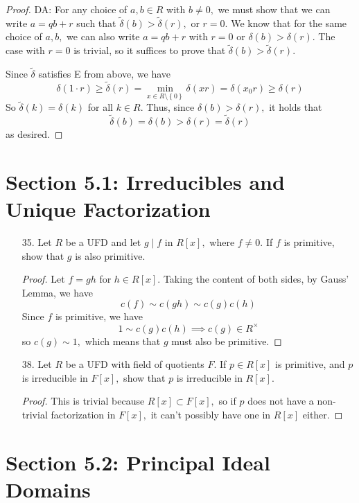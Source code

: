 \documentclass{article}
\begin{document}
\begin{enumerate}
\begin{proof}
			DA: For any choice of $a, b\in R$ with $b\neq 0,$ we must show that we can write $a=qb+r$ such that $\tilde\delta(b)>\tilde\delta(r),$ or $r=0.$ We know that for the same choice of $a, b,$ we can also write $a=qb+r$ with $r=0$ or $\delta(b)>\delta(r).$ The case with $r=0$ is trivial, so it suffices to prove that $\tilde\delta(b)>\tilde\delta(r).$

			Since $\tilde\delta$ satisfies E from above, we have
			\[\delta(1\cdot r)\ge \tilde\delta(r) = \min_{x\in R\setminus\left\{ 0 \right\}} \delta(xr) = \delta(x_0 r)\ge \delta(r) \]
			So $\tilde\delta(k) = \delta(k)$ for all $k\in R.$ Thus, since $\delta(b)>\delta(r),$ it holds that
			\[\tilde\delta(b)=\delta(b)>\delta(r)=\tilde\delta(r)\]
			as desired.
		\end{proof}
		
\end{enumerate}

\section*{Section 5.1: Irreducibles and Unique Factorization}

\begin{itemize}
	\item[35.] Let $R$ be a UFD and let $g\mid f$ in $R[x],$ where $f\neq 0.$ If $f$ is primitive, show that $g$ is also primitive.
		\begin{proof}
			Let $f=gh$ for $h\in R[x].$ Taking the content of both sides, by Gauss' Lemma, we have
			\[c(f)\sim c(gh)\sim c(g)c(h)\]
			Since $f$ is primitive, we have
			\[1\sim c(g)c(h)\implies c(g)\in R^\times\]
			so $c(g)\sim 1,$ which means that $g$ must also be primitive.
		\end{proof}

	\item[38.] Let $R$ be a UFD with field of quotients $F.$ If $p\in R[x]$ is primitive, and $p$ is irreducible in $F[x],$ show that $p$ is irreducible in $R[x].$
		\begin{proof}
			This is trivial because $R[x]\subset F[x],$ so if $p$ does not have a non-trivial factorization in $F[x],$ it can't possibly have one in $R[x]$ either.
		\end{proof}
		
\end{itemize}

\section*{Section 5.2: Principal Ideal Domains}
\end{document}

